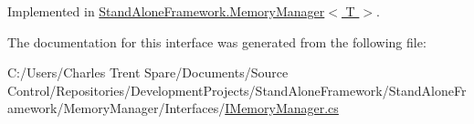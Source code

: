 Implemented in \hyperlink{class_stand_alone_framework_1_1_memory_manager_3_01_t_01_4_ad7aee15edbfecdb55eee947874a8c4cd}{Stand\+Alone\+Framework.\+Memory\+Manager$<$ T $>$}.



The documentation for this interface was generated from the following file\+:\begin{DoxyCompactItemize}
\item 
C\+:/\+Users/\+Charles Trent Spare/\+Documents/\+Source Control/\+Repositories/\+Development\+Projects/\+Stand\+Alone\+Framework/\+Stand\+Alone\+Framework/\+Memory\+Manager/\+Interfaces/\hyperlink{_i_memory_manager_8cs}{I\+Memory\+Manager.\+cs}\end{DoxyCompactItemize}
